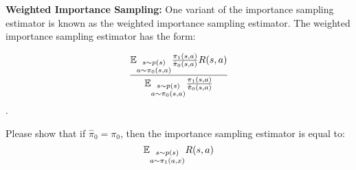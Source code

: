 \item   {} \textbf{Weighted Importance Sampling:} One variant of the importance sampling estimator is known as the weighted importance sampling estimator. The weighted importance sampling estimator has the form: 

$$\frac{\mathbb{E}_{\substack{s\sim p(s) \\ a \sim \pi_0(s, a)}} \frac{\pi_1(s, a)}{\hat{\pi}_0(s, a)} R(s, a)}{\mathbb{E}_{\substack{s\sim p(s) \\ a \sim \pi_0(s, a)}} \frac{\pi_1(s, a)}{\hat{\pi}_0(s, a)}}$$.

 Please show that if $\hat{\pi}_0 = \pi_0$, then the importance sampling estimator is equal to: 
$$\mathbb{E}_{\substack{s\sim p(s) \\ a \sim \pi_1(a, x)}} R(s, a)$$